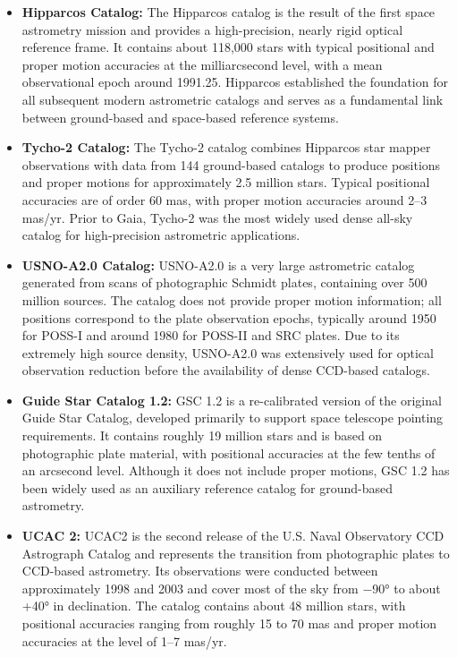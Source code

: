 \documentclass{aastex701}
\begin{document}
\begin{itemize}
    \item \textbf{Hipparcos Catalog:} \label{subsubsec:hipparcos} The Hipparcos catalog is the result of the first space astrometry mission and provides a high-precision, nearly rigid optical reference frame. It contains about 118,000 stars with typical positional and proper motion accuracies at the milliarcsecond level, with a mean observational epoch around 1991.25. Hipparcos established the foundation for all subsequent modern astrometric catalogs and serves as a fundamental link between ground-based and space-based reference systems.

    \item \textbf{Tycho-2 Catalog:} \label{subsubsec:tycho2} The Tycho-2 catalog combines Hipparcos star mapper observations with data from 144 ground-based catalogs to produce positions and proper motions for approximately 2.5 million stars. Typical positional accuracies are of order 60 mas, with proper motion accuracies around 2–3 mas/yr. Prior to Gaia, Tycho-2 was the most widely used dense all-sky catalog for high-precision astrometric applications.

    \item \textbf{USNO-A2.0 Catalog:} \label{subsubsec:usnoa2} USNO-A2.0 is a very large astrometric catalog generated from scans of photographic Schmidt plates, containing over 500 million sources. The catalog does not provide proper motion information; all positions correspond to the plate observation epochs, typically around 1950 for POSS-I and around 1980 for POSS-II and SRC plates. Due to its extremely high source density, USNO-A2.0 was extensively used for optical observation reduction before the availability of dense CCD-based catalogs.

    \item \textbf{Guide Star Catalog 1.2:} \label{subsubsec:gsc12} GSC 1.2 is a re-calibrated version of the original Guide Star Catalog, developed primarily to support space telescope pointing requirements. It contains roughly 19 million stars and is based on photographic plate material, with positional accuracies at the few tenths of an arcsecond level. Although it does not include proper motions, GSC 1.2 has been widely used as an auxiliary reference catalog for ground-based astrometry.

    \item \textbf{UCAC 2:} \label{subsubsec:ucac2} UCAC2 is the second release of the U.S. Naval Observatory CCD Astrograph Catalog and represents the transition from photographic plates to CCD-based astrometry. Its observations were conducted between approximately 1998 and 2003 and cover most of the sky from −90° to about +40° in declination. The catalog contains about 48 million stars, with positional accuracies ranging from roughly 15 to 70 mas and proper motion accuracies at the level of 1–7 mas/yr.


\end{itemize}
\end{document}
